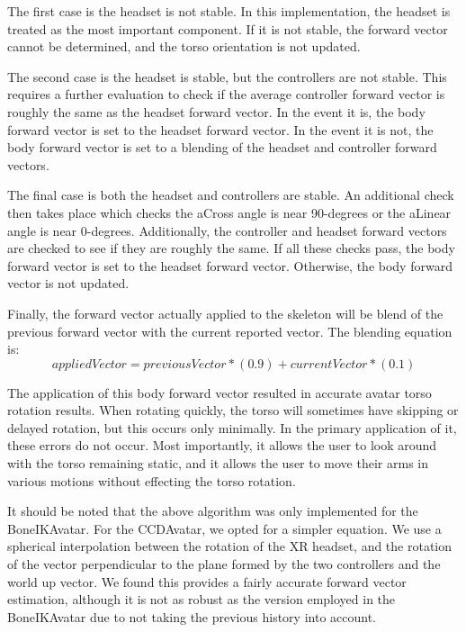 \documentclass{vgtc}                          %
\begin{document}
The first case is the headset is not stable. In this implementation, the headset is treated as the most important component. If it is not stable, the forward vector cannot be determined, and the torso orientation is not updated. 

The second case is the headset is stable, but the controllers are not stable. This requires a further evaluation to check if the average controller forward vector is roughly the same as the headset forward vector. In the event it is, the body forward vector is set to the headset forward vector. In the event it is not, the body forward vector is set to a blending of the headset and controller forward vectors. 

The final case is both the headset and controllers are stable. An additional check then takes place which checks the aCross angle is near 90-degrees or the aLinear angle is near 0-degrees. Additionally, the controller and headset forward vectors are checked to see if they are roughly the same. If all these checks pass, the body forward vector is set to the headset forward vector. Otherwise, the body forward vector is not updated. 

Finally, the forward vector actually applied to the skeleton will be blend of the previous forward vector with the current reported vector. The blending equation is: 
\begin{equation}
applied Vector = previous Vector * (0.9) + current Vector * (0.1)
\end{equation}

The application of this body forward vector resulted in accurate avatar torso rotation results. When rotating quickly, the torso will sometimes have skipping or delayed rotation, but this occurs only minimally. In the primary application of it, these errors do not occur. Most importantly, it allows the user to look around with the torso remaining static, and it allows the user to move their arms in various motions without effecting the torso rotation.  

It should be noted that the above algorithm was only implemented for the BoneIKAvatar. For the CCDAvatar, we opted for a simpler equation. We use a spherical interpolation between the rotation of the XR headset, and the rotation of the vector perpendicular to the plane formed by the two controllers and the world up vector. We found this provides a fairly accurate forward vector estimation, although it is not as robust as the version employed in the BoneIKAvatar due to not taking the previous history into account.
\end{document}
